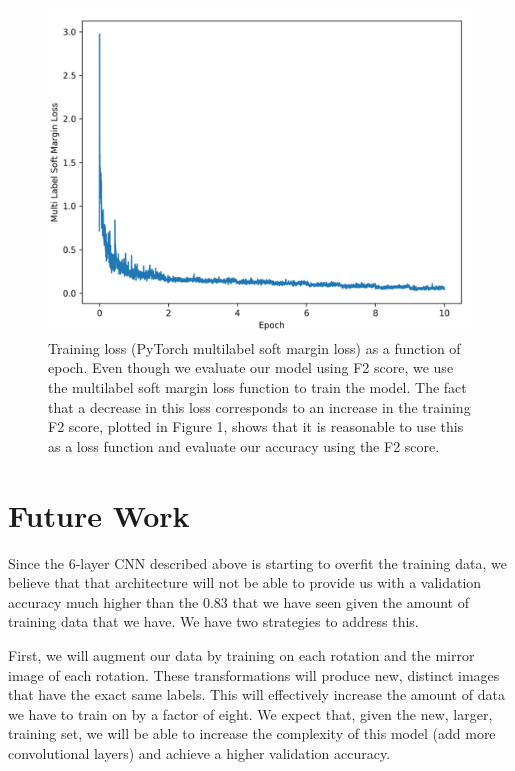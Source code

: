 \documentclass[10pt,twocolumn,letterpaper]{article}
\begin{document}
\begin{figure}
\includegraphics[width=\columnwidth]{LossCurve.png}
    \caption{Training loss (PyTorch multilabel soft margin loss) as a function of epoch. Even though we evaluate our model using F2 score, we use the multilabel soft margin loss function to train the model. The fact that a decrease in this loss corresponds to an increase in the training F2 score, plotted in Figure 1, shows that it is reasonable to use this as a loss function and evaluate our accuracy using the F2 score.}
\end{figure}


\section{Future Work}

Since the 6-layer CNN described above is starting to overfit the training data, we believe that that architecture will not be able to provide us with a validation accuracy much higher than the 0.83 that we have seen given the amount of training data that we have. We have two strategies to address this.

First, we will augment our data by training on each rotation and the mirror image of each rotation. These transformations will produce new, distinct images that have the exact same labels. This will effectively increase the amount of data we have to train on by a factor of eight. We expect that, given the new, larger, training set, we will be able to increase the complexity of this model (add more convolutional layers) and achieve a higher validation accuracy.
\end{document}
